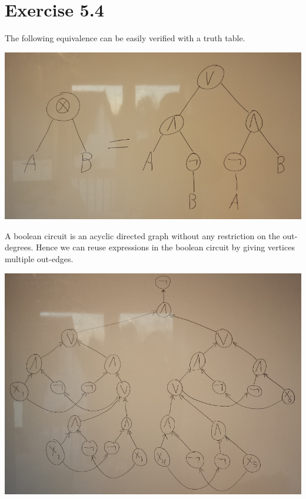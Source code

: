 \documentclass[10pt,a4paper]{article}
\begin{document}
\section*{Exercise 5.4}

The following equivalence can be easily verified with a truth table.

\includegraphics[width=\textwidth]{sheet-5/exercise-4-1}

A boolean circuit is an acyclic directed graph without any restriction on the out-degrees.
Hence we can reuse expressions in the boolean circuit by giving vertices multiple out-edges.

\includegraphics[width=\textwidth]{sheet-5/exercise-4-2}
\end{document}
